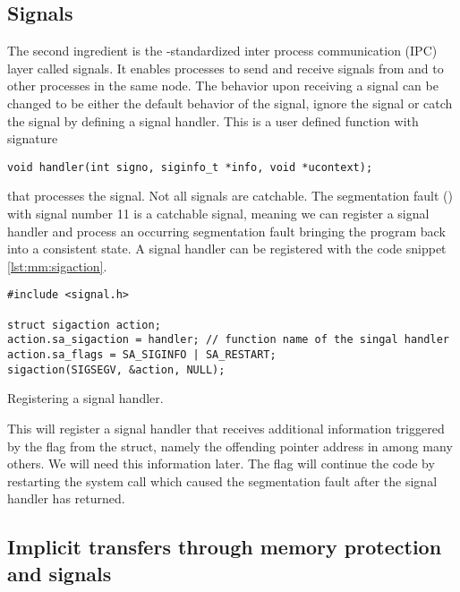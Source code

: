 \subsection{Signals}
\label{sec:mm:signals}

The second ingredient is the \posix-standardized inter process communication (IPC) layer called signals.
It enables processes to send and receive signals from and to other processes in the same node.
The behavior upon receiving a signal can be changed to be either the default behavior of the signal, ignore the signal or catch the signal by defining a signal handler.
This is a user defined function with signature
\begin{verbatim}
void handler(int signo, siginfo_t *info, void *ucontext);
\end{verbatim}
that processes the signal.
Not all signals are catchable.
The segmentation fault () with signal number \num{11} is a catchable signal, meaning we can register a signal handler and process an occurring segmentation fault bringing the program back into a consistent state.
A signal handler can be registered with the code snippet \cref{lst:mm:sigaction}.
\begin{codelisting}
\begin{verbatim}
#include <signal.h>

struct sigaction action;
action.sa_sigaction = handler; // function name of the singal handler
action.sa_flags = SA_SIGINFO | SA_RESTART;
sigaction(SIGSEGV, &action, NULL);
\end{verbatim}
\caption{Registering a signal handler.}
\label{lst:mm:sigaction}
\end{codelisting}
This will register a signal handler  that receives additional information triggered by the  flag from the  struct, namely the offending pointer address in  among many others.
We will need this information later.
The flag  will continue the code by restarting the system call which caused the segmentation fault after the signal handler has returned.

\subsection{Implicit transfers through memory protection and signals}

